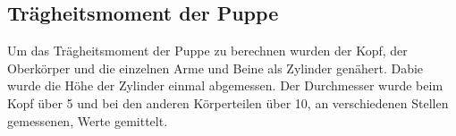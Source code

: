   \subsection{Trägheitsmoment der Puppe}
  Um das Trägheitsmoment der Puppe zu berechnen wurden der Kopf, der Oberkörper und die einzelnen Arme und Beine als Zylinder genähert.
  Dabie wurde die Höhe der Zylinder einmal abgemessen. 
  Der Durchmesser wurde beim Kopf über 5 und bei den anderen Körperteilen über 10, an verschiedenen Stellen gemessenen, Werte gemittelt.

